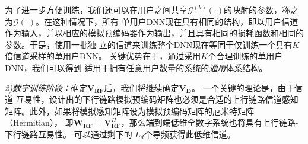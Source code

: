 \documentclass[10pt,journal,final]{IEEEtran}%
\begin{document}
为了进一步方便训练，我们还可以在用户之间共享$\mathcal{G}^{(k)}(\cdot )$的映射的参数，称之为$\mathcal{G}(\cdot )$。在这种情况下，所有
单用户DNN现在具有相同的结构，即以用户信道作为输入，并以相应的模拟预编码器作为输出，并且具有相同的损耗函数和相同的参数。于是，使用一批独
立的信道来训练整个DNN现在等同于仅训练一个具有$K$倍信道采样的单用户DNN。 关键优势在于，通过采用$K$个合理训练的单用户DNN，我们可以得到
适用于拥有任意用户数量的系统的\textit{通用}体系结构。

\textit{\fontsize{11pt}{20pt}2)数字训练阶段：}确定$\mathbf{V_{RF}}$后，我们将继续确定$\mathbf{V_{D}}$。 一个关键的理论是，由于信道
互易性，设计出的下行链路模拟预编码矩阵也必须是合适的上行链路信道感知矩阵。此外，如果将模拟感知矩阵设为模拟预编码矩阵的厄米特矩阵（Hermitian），
即$\mathbf{W}_{\mathbf{RF}}=\mathbf{V}_{\mathbf{RF}}^{H}$，那么端到端低维全数字系统也将具有上行链路-下行链路互易性。 可以通过剩下的
$L_{d}$个导频获得此低维信道。
\end{document}
